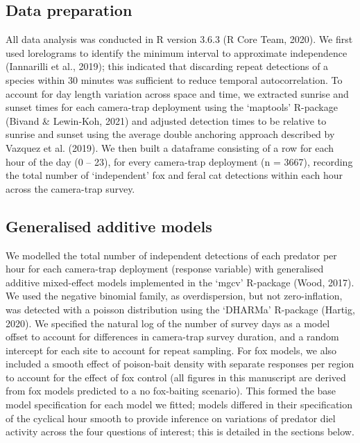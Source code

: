 \documentclass[]{elsarticle} %
\begin{document}
\hypertarget{data-preparation}{%
\subsection{Data preparation}\label{data-preparation}}

All data analysis was conducted in R version 3.6.3 (R Core Team, 2020). We first used lorelograms to identify the minimum interval to approximate independence (Iannarilli et al., 2019); this indicated that discarding repeat detections of a species within 30 minutes was sufficient to reduce temporal autocorrelation. To account for day length variation across space and time, we extracted sunrise and sunset times for each camera-trap deployment using the `maptools' R-package (Bivand \& Lewin-Koh, 2021) and adjusted detection times to be relative to sunrise and sunset using the average double anchoring approach described by Vazquez et al. (2019). We then built a dataframe consisting of a row for each hour of the day (0 -- 23), for every camera-trap deployment (n = 3667), recording the total number of `independent' fox and feral cat detections within each hour across the camera-trap survey.

\hypertarget{generalised-additive-models}{%
\subsection{Generalised additive models}\label{generalised-additive-models}}

We modelled the total number of independent detections of each predator per hour for each camera-trap deployment (response variable) with generalised additive mixed-effect models implemented in the `mgcv' R-package (Wood, 2017). We used the negative binomial family, as overdispersion, but not zero-inflation, was detected with a poisson distribution using the `DHARMa' R-package (Hartig, 2020). We specified the natural log of the number of survey days as a model offset to account for differences in camera-trap survey duration, and a random intercept for each site to account for repeat sampling. For fox models, we also included a smooth effect of poison-bait density with separate responses per region to account for the effect of fox control (all figures in this manuscript are derived from fox models predicted to a no fox-baiting scenario). This formed the base model specification for each model we fitted; models differed in their specification of the cyclical hour smooth to provide inference on variations of predator diel activity across the four questions of interest; this is detailed in the sections below.
\end{document}
